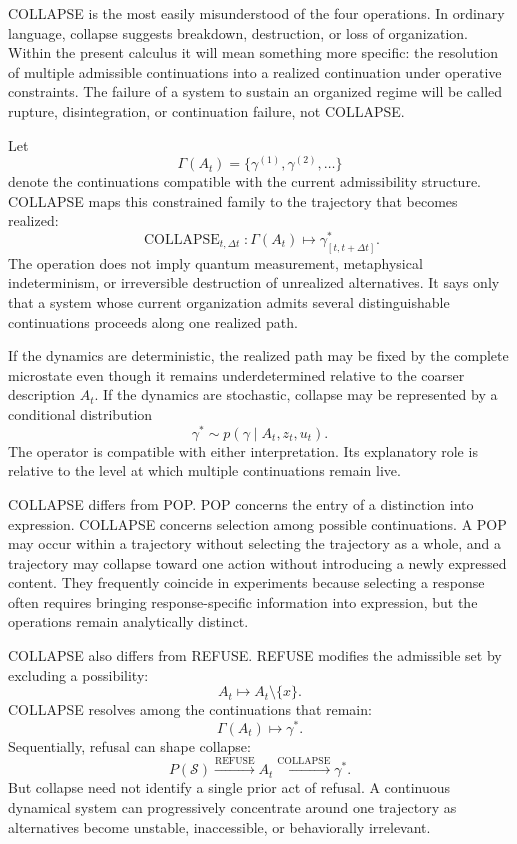 \documentclass[11pt]{book}
\begin{document}
COLLAPSE is the most easily misunderstood of the four operations. In ordinary language, collapse suggests breakdown, destruction, or loss of organization. Within the present calculus it will mean something more specific: the resolution of multiple admissible continuations into a realized continuation under operative constraints. The failure of a system to sustain an organized regime will be called rupture, disintegration, or continuation failure, not COLLAPSE.

Let
\[
\Gamma(A_t)
=
\{\gamma^{(1)},\gamma^{(2)},\ldots\}
\]
denote the continuations compatible with the current admissibility structure. COLLAPSE maps this constrained family to the trajectory that becomes realized:
\[
\operatorname{COLLAPSE}_{t,\Delta t}:
\Gamma(A_t)\longmapsto
\gamma^{*}_{[t,t+\Delta t]}.
\]
The operation does not imply quantum measurement, metaphysical indeterminism, or irreversible destruction of unrealized alternatives. It says only that a system whose current organization admits several distinguishable continuations proceeds along one realized path.

If the dynamics are deterministic, the realized path may be fixed by the complete microstate even though it remains underdetermined relative to the coarser description $A_t$. If the dynamics are stochastic, collapse may be represented by a conditional distribution
\[
\gamma^{*}
\sim
p\!\left(\gamma\mid A_t,z_t,u_t\right).
\]
The operator is compatible with either interpretation. Its explanatory role is relative to the level at which multiple continuations remain live.

COLLAPSE differs from POP. POP concerns the entry of a distinction into expression. COLLAPSE concerns selection among possible continuations. A POP may occur within a trajectory without selecting the trajectory as a whole, and a trajectory may collapse toward one action without introducing a newly expressed content. They frequently coincide in experiments because selecting a response often requires bringing response-specific information into expression, but the operations remain analytically distinct.

COLLAPSE also differs from REFUSE. REFUSE modifies the admissible set by excluding a possibility:
\[
A_t\longmapsto A_t\setminus\{x\}.
\]
COLLAPSE resolves among the continuations that remain:
\[
\Gamma(A_t)\longmapsto\gamma^{*}.
\]
Sequentially, refusal can shape collapse:
\[
P(\mathcal S)
\xrightarrow{\operatorname{REFUSE}}
A_t
\xrightarrow{\operatorname{COLLAPSE}}
\gamma^{*}.
\]
But collapse need not identify a single prior act of refusal. A continuous dynamical system can progressively concentrate around one trajectory as alternatives become unstable, inaccessible, or behaviorally irrelevant.
\end{document}
